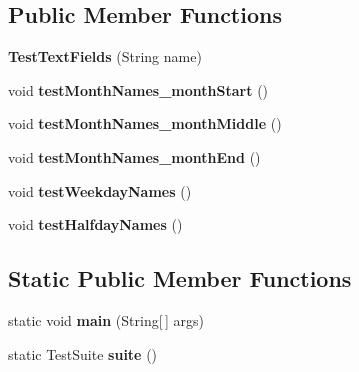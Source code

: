 \subsection*{Public Member Functions}
\begin{DoxyCompactItemize}
\item 
\hypertarget{classorg_1_1joda_1_1time_1_1format_1_1_test_text_fields_a415ba10f92d65fa8527d3146d3751a06}{{\bfseries Test\-Text\-Fields} (String name)}\label{classorg_1_1joda_1_1time_1_1format_1_1_test_text_fields_a415ba10f92d65fa8527d3146d3751a06}

\item 
\hypertarget{classorg_1_1joda_1_1time_1_1format_1_1_test_text_fields_a05dc60961985907b66cd85806f6027e6}{void {\bfseries test\-Month\-Names\-\_\-month\-Start} ()}\label{classorg_1_1joda_1_1time_1_1format_1_1_test_text_fields_a05dc60961985907b66cd85806f6027e6}

\item 
\hypertarget{classorg_1_1joda_1_1time_1_1format_1_1_test_text_fields_ab5017b60b3cb343d55b2a41ba220d792}{void {\bfseries test\-Month\-Names\-\_\-month\-Middle} ()}\label{classorg_1_1joda_1_1time_1_1format_1_1_test_text_fields_ab5017b60b3cb343d55b2a41ba220d792}

\item 
\hypertarget{classorg_1_1joda_1_1time_1_1format_1_1_test_text_fields_a07d37e6e990607fb868629d0ce315e80}{void {\bfseries test\-Month\-Names\-\_\-month\-End} ()}\label{classorg_1_1joda_1_1time_1_1format_1_1_test_text_fields_a07d37e6e990607fb868629d0ce315e80}

\item 
\hypertarget{classorg_1_1joda_1_1time_1_1format_1_1_test_text_fields_a388d55086992f12b097d9d52cb0d5822}{void {\bfseries test\-Weekday\-Names} ()}\label{classorg_1_1joda_1_1time_1_1format_1_1_test_text_fields_a388d55086992f12b097d9d52cb0d5822}

\item 
\hypertarget{classorg_1_1joda_1_1time_1_1format_1_1_test_text_fields_a38ff12e07bfed44e702f500112e0e0a0}{void {\bfseries test\-Halfday\-Names} ()}\label{classorg_1_1joda_1_1time_1_1format_1_1_test_text_fields_a38ff12e07bfed44e702f500112e0e0a0}

\end{DoxyCompactItemize}
\subsection*{Static Public Member Functions}
\begin{DoxyCompactItemize}
\item 
\hypertarget{classorg_1_1joda_1_1time_1_1format_1_1_test_text_fields_ae5f4d9c7a09f1f313e55b4becd4b7e57}{static void {\bfseries main} (String\mbox{[}$\,$\mbox{]} args)}\label{classorg_1_1joda_1_1time_1_1format_1_1_test_text_fields_ae5f4d9c7a09f1f313e55b4becd4b7e57}

\item 
\hypertarget{classorg_1_1joda_1_1time_1_1format_1_1_test_text_fields_a1c8862d1fceb69553da783eb7571e8f1}{static Test\-Suite {\bfseries suite} ()}\label{classorg_1_1joda_1_1time_1_1format_1_1_test_text_fields_a1c8862d1fceb69553da783eb7571e8f1}

\end{DoxyCompactItemize}
